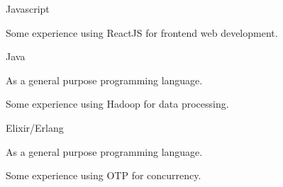 \begin{cvskills}
\cvskill
{Javascript} %
{
  \begin{cvitems}
  \item {Some experience using ReactJS for frontend web development.}
  \end{cvitems}
}


\cvskill
{Java} %
{
  \begin{cvitems}
  \item {As a general purpose programming language.}
  \item {Some experience using Hadoop for data processing.}
  \end{cvitems}
}


\cvskill
{Elixir/Erlang} %
{
  \begin{cvitems}
  \item {As a general purpose programming language.}
  \item {Some experience using OTP for concurrency.}
  \end{cvitems}
}


\end{cvskills}
